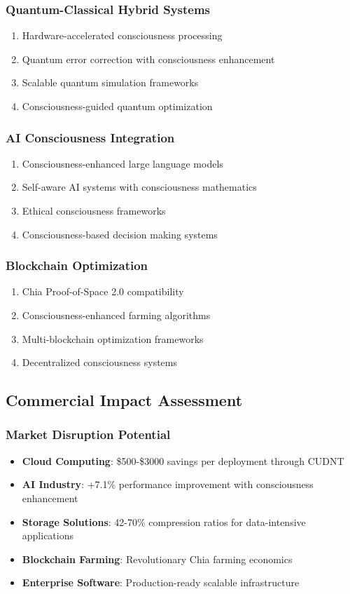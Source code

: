 \documentclass[11pt,a4paper]{article}
\begin{document}
\subsubsection{Quantum-Classical Hybrid Systems}
\begin{enumerate}
\item Hardware-accelerated consciousness processing
\item Quantum error correction with consciousness enhancement
\item Scalable quantum simulation frameworks
\item Consciousness-guided quantum optimization
\end{enumerate}

\subsubsection{AI Consciousness Integration}
\begin{enumerate}
\item Consciousness-enhanced large language models
\item Self-aware AI systems with consciousness mathematics
\item Ethical consciousness frameworks
\item Consciousness-based decision making systems
\end{enumerate}

\subsubsection{Blockchain Optimization}
\begin{enumerate}
\item Chia Proof-of-Space 2.0 compatibility
\item Consciousness-enhanced farming algorithms
\item Multi-blockchain optimization frameworks
\item Decentralized consciousness systems
\end{enumerate}

\subsection{Commercial Impact Assessment}

\subsubsection{Market Disruption Potential}
\begin{itemize}
\item \textbf{Cloud Computing}: \$500-\$3000 savings per deployment through CUDNT
\item \textbf{AI Industry}: +7.1\% performance improvement with consciousness enhancement
\item \textbf{Storage Solutions}: 42-70\% compression ratios for data-intensive applications
\item \textbf{Blockchain Farming}: Revolutionary Chia farming economics
\item \textbf{Enterprise Software}: Production-ready scalable infrastructure
\end{itemize}
\end{document}
